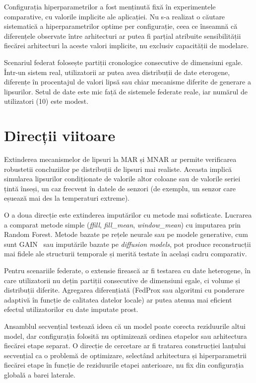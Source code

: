 Configurația hiperparametrilor a fost menținută fixă în experimentele comparative, cu valorile implicite ale aplicației. Nu s-a realizat o căutare sistematică a hiperparametrilor optime per configurație, ceea ce înseamnă că diferențele observate între arhitecturi ar putea fi parțial atribuite sensibilității fiecărei arhitecturi la aceste valori implicite, nu exclusiv capacității de modelare.

Scenariul federat folosește partiții cronologice consecutive de dimensiuni egale. Într-un sistem real, utilizatorii ar putea avea distribuții de date eterogene, diferențe în procentajul de valori lipsă sau chiar mecanisme diferite de generare a lipsurilor. Setul de date este mic față de sistemele federate reale, iar numărul de utilizatori (10) este modest.

\section{Direcții viitoare}

Extinderea mecanismelor de lipsuri la MAR și MNAR ar permite verificarea robustetii concluziilor pe distribuții de lipsuri mai realiste. Aceasta implică simularea lipsurilor condiționate de valorile altor coloane sau de valorile seriei țintă înseși, un caz frecvent în datele de senzori (de exemplu, un senzor care eșuează mai des la temperaturi extreme).

O a doua direcție este extinderea imputărilor cu metode mai sofisticate. Lucrarea a comparat metode simple (\textit{ffill}, \textit{fill\_mean}, \textit{window\_mean}) cu imputarea prin Random Forest. Metode bazate pe rețele neurale sau pe modele generative, cum sunt GAIN~\cite{yoon2018gain} sau imputările bazate pe \textit{diffusion models}, pot produce reconstrucții mai fidele ale structurii temporale și merită testate în același cadru comparativ.

Pentru scenariile federate, o extensie firească ar fi testarea cu date heterogene, în care utilizatorii nu dețin partiții consecutive de dimensiuni egale, ci volume și distribuții diferite. Agregarea diferențiată (FedProx sau algoritmi cu ponderare adaptivă în funcție de calitatea datelor locale) ar putea atenua mai eficient efectul utilizatorilor cu date imputate prost.

Ansamblul secvențial testează ideea că un model poate corecta reziduurile altui model, dar configurația folosită nu optimizează ordinea etapelor sau arhitectura fiecărei etape separat. O direcție de cercetare ar fi tratarea construcției lanțului secvențial ca o problemă de optimizare, selectând arhitectura și hiperparametrii fiecărei etape în funcție de reziduurile etapei anterioare, nu fix din configurația globală a barei laterale.

